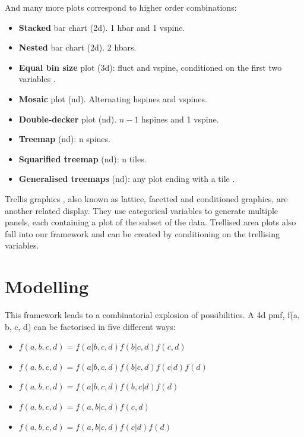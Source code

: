 \documentclass[letterpaper,oneside]{scrartcl}
\begin{document}
\noindent And many more plots correspond to higher order combinations:

\begin{itemize}
  \item {\bf Stacked} bar chart (2d). 1 hbar and 1 vspine.

  \item {\bf Nested} bar chart (2d).  2 hbars. \citep{peltier:2009}

  \item {\bf Equal bin size} plot (3d): fluct and vspine, conditioned on the first two variables \citep{hofmann:2000}.

  \item {\bf Mosaic} plot (nd).  Alternating hspines and vspines.  \citep{hartigan:1981,friendly:1994,hofmann:2003}

  \item {\bf Double-decker} plot (nd).  $n-1$ hspines and 1 vspine. \citep{hofmann:2001}

  \item {\bf Treemap} (nd): n spines. \citep{shneiderman:1992}

  \item {\bf Squarified treemap} (nd): n tiles. \citep{bruls:1999}

  \item {\bf Generalised treemaps} (nd): any plot ending with a tile \citep{vliegen:2006}.

\end{itemize}

Trellis graphics \citep{becker:1996}, also known as lattice, facetted and conditioned graphics, are another related display. They use categorical variables to generate multiple panels, each containing a plot of the subset of the data. Trellised area plots also fall into our framework and can be created by conditioning on the trellising variables.

\section{Modelling}
\label{sec:models}

This framework leads to a combinatorial explosion of possibilities. A 4d pmf, f(a, b, c, d) can be factorised in five different ways:

\begin{itemize}
  \item $f(a, b, c, d) = f(a | b, c, d) f(b | c, d) f(c, d)$
  \item $f(a, b, c, d) = f(a | b, c, d) f(b | c, d) f(c | d) f(d)$
  \item $f(a, b, c, d) = f(a | b, c, d) f(b, c | d) f(d)$
  \item $f(a, b, c, d) = f(a, b | c, d) f(c, d)$
  \item $f(a, b, c, d) = f(a, b | c, d) f(c | d) f(d)$
\end{itemize}
\end{document}
